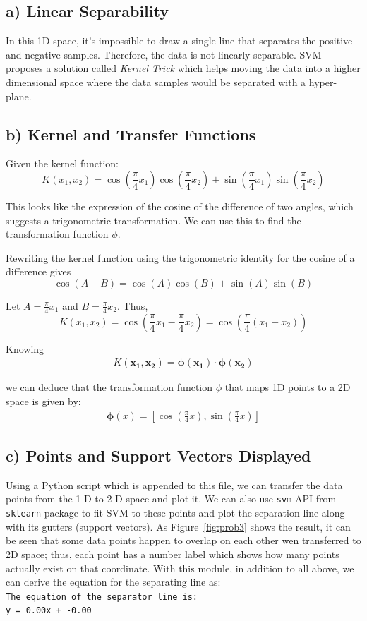 \documentclass[conference]{IEEEtran}
\begin{document}
\subsection*{a) Linear Separability}
In this 1D space, it's impossible to draw a single line that separates the positive and negative samples. Therefore, the data is not linearly separable. SVM proposes a solution called \textit{Kernel Trick} which helps moving the data into a higher dimensional space where the data samples would be separated with a hyper-plane.

\subsection*{b) Kernel and Transfer Functions}
Given the kernel function:
\[
    K(x_1, x_2) = \cos\left(\frac{\pi}{4}x_1\right)\cos\left(\frac{\pi}{4}x_2\right) + \sin\left(\frac{\pi}{4}x_1\right)\sin\left(\frac{\pi}{4}x_2\right)
\]

This looks like the expression of the cosine of the difference of two angles, which suggests a trigonometric transformation. We can use this to find the transformation function \( \phi \).

Rewriting the kernel function using the trigonometric identity for the cosine of a difference gives
\[
    \cos(A - B) = \cos(A)\cos(B) + \sin(A)\sin(B)
\]

Let \( A = \frac{\pi}{4}x_1 \) and \( B = \frac{\pi}{4}x_2 \). Thus,
\[
    K(x_1, x_2) = \cos\left(\frac{\pi}{4}x_1 - \frac{\pi}{4}x_2\right) = \cos\left(\frac{\pi}{4}(x_1 - x_2)\right)
\]

Knowing
\begin{align}
    K(\mathbf{x_1}, \mathbf{x_2}) = \mathbf{\phi(x_1)} \cdot \mathbf{\phi(x_2)}
\end{align}


we can deduce that the transformation function \( \phi \) that maps 1D points to a 2D space is given by:
\begin{align}
    \boldsymbol{\phi}(x) = \left[ \cos\left(\frac{\pi}{4}x\right), \sin\left(\frac{\pi}{4}x\right) \right]
\end{align}


\subsection*{c) Points and Support Vectors Displayed}
Using a Python script which is appended to this file, we can transfer the data points from the 1-D to 2-D space and plot it. We can also use \texttt{svm} API from \texttt{sklearn} package to fit SVM to these points and plot the separation line along with its gutters (support vectors). As Figure~\ref{fig:prob3} shows the result, it can be seen that some data points happen to overlap on each other wen transferred to 2D space; thus, each point has a number label which shows how many points actually exist on that coordinate. With this module, in addition to all above, we can derive the equation for the separating line as: \\
\texttt{The equation of the separator line is: \\ y = 0.00x + -0.00}
\end{document}

